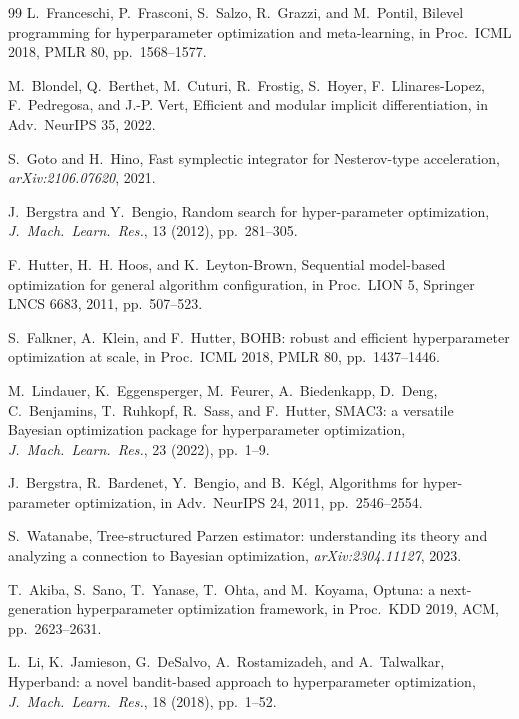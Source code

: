\documentclass[11pt]{article}
\begin{document}
\begin{thebibliography}{99}
L.~Franceschi, P.~Frasconi, S.~Salzo, R.~Grazzi, and M.~Pontil,
Bilevel programming for hyperparameter optimization and meta-learning,
in Proc.\ ICML 2018, PMLR 80, pp.~1568--1577.

M.~Blondel, Q.~Berthet, M.~Cuturi, R.~Frostig, S.~Hoyer,
F.~Llinares-Lopez, F.~Pedregosa, and J.-P. Vert,
Efficient and modular implicit differentiation,
in Adv.\ NeurIPS 35, 2022.

S.~Goto and H.~Hino,
Fast symplectic integrator for Nesterov-type acceleration,
\textit{arXiv:2106.07620}, 2021.

J.~Bergstra and Y.~Bengio,
Random search for hyper-parameter optimization,
\textit{J.\ Mach.\ Learn.\ Res.}, 13 (2012), pp.~281--305.

F.~Hutter, H.~H. Hoos, and K.~Leyton-Brown,
Sequential model-based optimization for general algorithm
configuration,
in Proc.\ LION 5, Springer LNCS 6683, 2011, pp.~507--523.

S.~Falkner, A.~Klein, and F.~Hutter,
BOHB: robust and efficient hyperparameter optimization at scale,
in Proc.\ ICML 2018, PMLR 80, pp.~1437--1446.

M.~Lindauer, K.~Eggensperger, M.~Feurer, A.~Biedenkapp,
D.~Deng, C.~Benjamins, T.~Ruhkopf, R.~Sass, and F.~Hutter,
SMAC3: a versatile Bayesian optimization package for hyperparameter
optimization,
\textit{J.\ Mach.\ Learn.\ Res.}, 23 (2022), pp.~1--9.

J.~Bergstra, R.~Bardenet, Y.~Bengio, and B.~K\'{e}gl,
Algorithms for hyper-parameter optimization,
in Adv.\ NeurIPS 24, 2011, pp.~2546--2554.

S.~Watanabe,
Tree-structured Parzen estimator: understanding its theory and
analyzing a connection to Bayesian optimization,
\textit{arXiv:2304.11127}, 2023.

T.~Akiba, S.~Sano, T.~Yanase, T.~Ohta, and M.~Koyama,
Optuna: a next-generation hyperparameter optimization framework,
in Proc.\ KDD 2019, ACM, pp.~2623--2631.

L.~Li, K.~Jamieson, G.~DeSalvo, A.~Rostamizadeh, and A.~Talwalkar,
Hyperband: a novel bandit-based approach to hyperparameter
optimization,
\textit{J.\ Mach.\ Learn.\ Res.}, 18 (2018), pp.~1--52.


\end{thebibliography}
\end{document}
